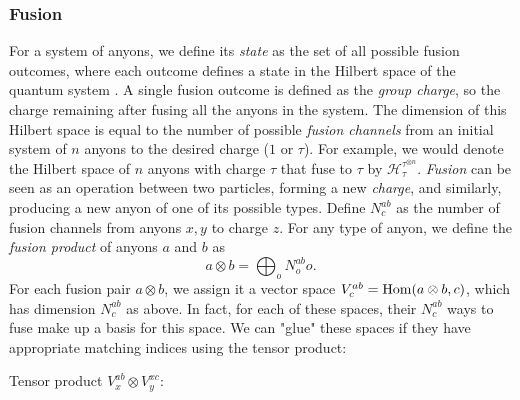 \documentclass{article}
\begin{document}
\subsubsection{Fusion}
\label{Fusion}
For a system of anyons, we define its {\it state} as the set of all possible fusion outcomes, where each outcome defines a state in the Hilbert space of the quantum system \cite{field_introduction_2018}. A single fusion outcome is defined as the {\it group charge}, so the charge remaining after fusing all the anyons in the system.  The dimension of this Hilbert space is equal to the number of possible {\it fusion channels} from an initial system of $n$ anyons to the desired charge ($1$ or $\tau$). For example, we would denote the Hilbert space of $n$ anyons with charge $\tau$ that fuse to $\tau$ by $\mathcal{H}^{\tau^{\otimes n}}_{\tau}$.
{\it Fusion} can be seen as an operation between two particles, forming a new {\it charge}, and similarly, producing a new anyon of one of its possible types. Define $N^{ab}_{c}$ as the number of fusion channels from anyons $x,y$ to charge $z$. For any type of anyon, we define the {\it fusion product} \cite{lahtinen_short_2017} of anyons $a$ and $b$ as 
\[
  a \otimes b = \bigoplus_{o} N^{ab}_{o} o.
\]
For each fusion pair $a \otimes b$, we assign it a vector space $V^{ab}_{c} = \operatorname{Hom}(a\otimes b, c)$, which has dimension $N^{ab}_c$ as above. In fact, for each of these spaces, their $N^{ab}_c$ ways to fuse make up a basis for this space. We can "glue" these spaces if they have appropriate matching indices using the tensor product:


\begin{center}
  \footnotesize{\color{blue}Tensor product $V^{ab}_{x} \otimes V^{xc}_{y}$:}
\end{center}
 
\end{document}
